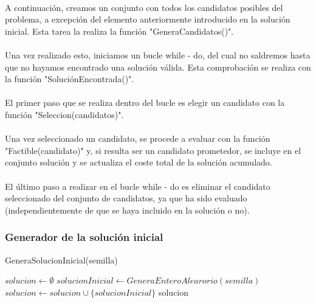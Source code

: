 \documentclass{article}
\begin{document}
	\paragraph{}A continuación, creamos un conjunto con todos los candidatos posibles del problema, a excepción del elemento anteriormente introducido en la solución inicial. Esta tarea la realiza la función "GeneraCandidatos()".
	
	\paragraph{}Una vez realizado esto, iniciamos un bucle while - do, del cual no saldremos hasta que no hayamos encontrado una solución válida. Esta comprobación se realiza con la función "SoluciónEncontrada()".
	
	\paragraph{}El primer paso que se realiza dentro del bucle es elegir un candidato con la función "Seleccion(candidatos)".
	
	\paragraph{}Una vez seleccionado un candidato, se procede a evaluar con la función "Factible(candidato)" y, si resulta ser un candidato prometedor, se incluye en el conjunto solución y se actualiza el coste total de la solución acumulado.
	
	\paragraph{}El último paso a realizar en el bucle while - do es eliminar el candidato seleccionado del conjunto de candidatos, ya que ha sido evaluado (independientemente de que se haya incluido en la solución o no).
	
	
	
	\subsubsection{Generador de la solución inicial}
	\begin{algorithm}[H]
		\caption{GeneraSolucionInicial(semilla)}
		\begin{algorithmic}
			\STATE $solucion \leftarrow \emptyset$
			\STATE $solucionInicial \leftarrow GeneraEnteroAlearorio(semilla)$
			\STATE $solucion \leftarrow solucion \cup \{solucionInicial\}$
			\RETURN solucion
		\end{algorithmic}
	\end{algorithm}
	
\end{document}
